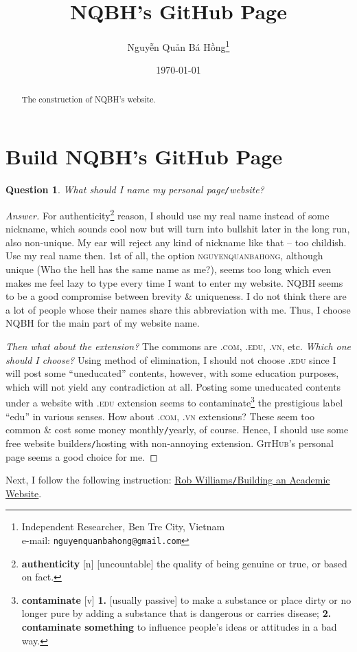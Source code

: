 \documentclass{article}
\title{NQBH's GitHub Page}
\author{\selectlanguage{vietnamese} Nguyễn Quản Bá Hồng\footnote{Independent Researcher, Ben Tre City, Vietnam\\e-mail: \texttt{nguyenquanbahong@gmail.com}}}
\date{\today}
\numberwithin{equation}{section}
\newtheorem{question}{Question}[section]
\begin{document}
\maketitle
{}
\begin{abstract}
	The construction of NQBH's website.
\end{abstract}

\tableofcontents
{}


\section{Build NQBH's GitHub Page}

\begin{question}
	What should I name my personal page\emph{\texttt{/}}website?
\end{question}

\begin{proof}[Answer]
	For authenticity\footnote{\textbf{authenticity} [n] [uncountable] the quality of being genuine or true, or based on fact.} reason, I should use my real name instead of some nickname, which sounds cool now but will turn into bullshit later in the long run, also non-unique. My ear will reject any kind of nickname like that -- too childish. Use my real name then. 1st of all, the option \textsc{nguyenquanbahong}, although unique (Who the hell has the same name as me?), seems too long which even makes me feel lazy to type every time I want to enter my website. \textsc{NQBH} seems to be a good compromise between brevity \& uniqueness. I do not think there are a lot of people whose their names share this abbreviation with me. Thus, I choose NQBH for the main part of my website name.
	
	\textit{Then what about the extension?} The commons are \textsc{.com, .edu, .vn}, etc. \textit{Which one should I choose?} Using method of elimination, I should not choose \textsc{.edu} since I will post some ``uneducated'' contents, however, with some education purposes, which will not yield any contradiction at all. Posting some uneducated contents under a website with \textsc{.edu} extension seems to contaminate\footnote{\textbf{contaminate} [v] \textbf{1.} [usually passive] to make a substance or place dirty or no longer pure by adding a substance that is dangerous or carries disease; \textbf{2.} \textbf{contaminate something} to influence people's ideas or attitudes in a bad way.} the prestigious label ``edu'' in various senses. How about \textsc{.com, .vn} extensions? These seem too common \& cost some money monthly\texttt{/}yearly, of course. Hence, I should use some free website builders\texttt{/}hosting with non-annoying extension. \textsc{GitHub}'s personal page seems a good choice for me.
\end{proof}
Next, I follow the following instruction: \href{https://jayrobwilliams.com/posts/2020/06/academic-website/}{Rob Williams\texttt{/}Building an Academic Website}.
\end{document}
